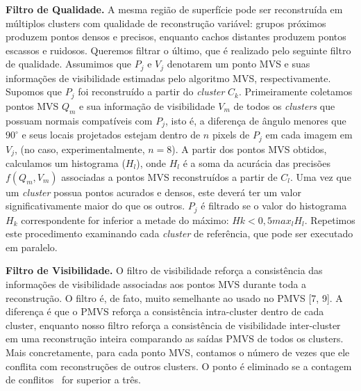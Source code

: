 \noindent\textbf{Filtro de Qualidade.}
A mesma região de superfície pode ser reconstruída em múltiplos clusters com qualidade de reconstrução variável: grupos próximos produzem pontos densos e precisos, enquanto cachos distantes produzem pontos escassos e ruidosos. Queremos filtrar o último, que é realizado pelo seguinte filtro de qualidade. Assumimos que $P_j$ e $V_j$ denotarem um ponto MVS e suas informações de visibilidade estimadas pelo algoritmo MVS, respectivamente. Supomos que $P_j$ foi reconstruído a partir do \emph{cluster} $C_k$. Primeiramente coletamos pontos MVS ${Q_m}$ e sua informação de visibilidade ${V_m}$ de todos os \emph{clusters} que possuam normais compatíveis com $P_j$, isto é, a diferença de ângulo menores que $90^\circ$ e seus locais projetados estejam dentro de $n$ pixels de $P_j$ em cada imagem em $V_j$, (no caso, experimentalmente, $n=8$). A partir dos pontos MVS obtidos, calculamos um histograma ($H_l$), onde $H_l$ é a soma da acurácia das precisões $f(Q_m,V_m)$ associadas a pontos MVS reconstruídos a partir de $C_l$. Uma vez que um \emph{cluster} possua pontos acurados e densos, este deverá ter um valor significativamente maior do que os outros. $P_j$ é filtrado se o valor do histograma $H_k$ correspondente for inferior a metade do máximo: $Hk < 0,5 max_l H_l$. Repetimos este procedimento examinando cada \emph{cluster} de referência, que pode ser executado em paralelo. 

\noindent\textbf{Filtro de Visibilidade.}
O filtro de visibilidade reforça a consistência das informações de visibilidade associadas aos pontos MVS durante toda a reconstrução. O filtro é, de fato, muito semelhante ao usado no PMVS [7, 9]. A diferença é que o PMVS reforça a consistência intra-cluster dentro de cada cluster, enquanto nosso filtro reforça a consistência de visibilidade inter-cluster em uma reconstrução inteira comparando as saídas PMVS de todos os clusters. Mais concretamente, para cada ponto MVS, contamos o número de vezes que ele conflita com reconstruções de outros clusters. O ponto é eliminado se a contagem de conflitos~\cite{furukawa2010towards,furukawa2010accurate} for superior a três.


